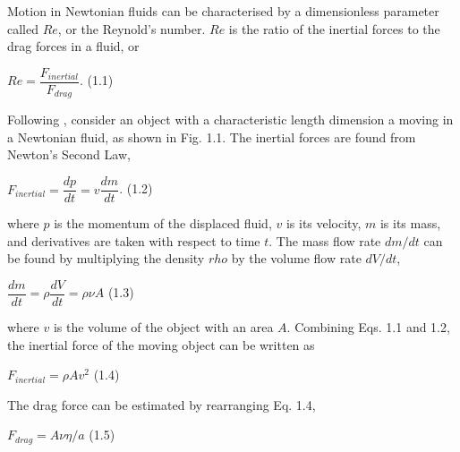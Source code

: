 Motion in Newtonian fluids can be characterised by a dimensionless parameter called $Re$, or the Reynold’s number. $Re$ is the ratio of the inertial forces to the drag forces in a fluid, or 

\vspace{7mm}
\hspace{63mm} $Re = \dfrac{F_{inertial}} {F_{drag}}$. \hspace*{0pt}\hfill (1.1) 
\vspace{7mm}

Following \citep{Purcell}, consider an object with a characteristic length dimension a moving in a Newtonian fluid, as shown in Fig. 1.1.  The inertial forces are found from Newton’s Second Law,

\vspace{7mm}
\hspace{52mm} $F_{inertial} = \dfrac{dp}{dt} = v \dfrac{dm}{dt}$. \hspace*{0pt}\hfill (1.2) 
\vspace{7mm}

where $p$ is the momentum of the displaced fluid, $v$ is its velocity, $m$ is its mass, and derivatives are taken with respect to time $t$. The mass flow rate $dm/dt$ can be found by multiplying the density $rho$ by the volume flow rate $dV/dt$,

\vspace{7mm}
\hspace{52mm} $\dfrac{dm}{dt} = \rho \dfrac{dV}{dt} = \rho \nu A$ \hspace*{0pt}\hfill (1.3) 
\vspace{7mm}

where $v$ is the volume of the object with an area $A$. Combining Eqs. 1.1 and 1.2, the inertial force of the moving object can be written as

\vspace{7mm}
\hspace{52mm} $F_{inertial} = \rho A v^2 $ \hspace*{0pt}\hfill (1.4) 
\vspace{7mm}



The drag force can be estimated by rearranging Eq. 1.4,

\vspace{7mm}
\hspace{52mm} $F_{drag} = A \nu \eta/a$ \hspace*{0pt}\hfill (1.5) 
\vspace{7mm}

